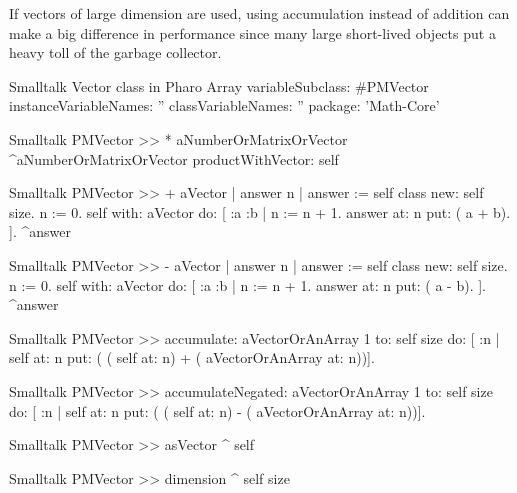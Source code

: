 If vectors of large dimension are used, using accumulation instead
of addition can make a big difference in performance since many
large short-lived objects put a heavy toll of the garbage
collector.

\begin{listing}[label=ls:vector]{Smalltalk}
{Vector class in Pharo}
Array variableSubclass: #PMVector
   instanceVariableNames: ''
   classVariableNames: ''
   package: 'Math-Core'
\end{listing}

\begin{displaycode}{Smalltalk}
PMVector >> * aNumberOrMatrixOrVector
    ^aNumberOrMatrixOrVector productWithVector: self
\end{displaycode}

\begin{displaycode}{Smalltalk}
PMVector >> + aVector
    | answer n |
    answer := self class new: self size.
    n := 0.
    self with: aVector do:
        [ :a :b | 
          n := n + 1. 
          answer at: n put: ( a + b).
        ].
    ^answer
\end{displaycode}

\begin{displaycode}{Smalltalk}
PMVector >> - aVector
    | answer n |
    answer := self class new: self size.
    n := 0.
    self with: aVector do:
        [ :a :b | 
          n := n + 1. 
          answer at: n put: ( a - b).
        ].
    ^answer
\end{displaycode}

\begin{displaycode}{Smalltalk}
PMVector >> accumulate: aVectorOrAnArray
    1 to: self size do: [ :n | self at: n put: ( ( self at: n) + ( 
                                            aVectorOrAnArray at: n))].
\end{displaycode}

\begin{displaycode}{Smalltalk}
PMVector >> accumulateNegated: aVectorOrAnArray
    1 to: self size do: [ :n | self at: n put: ( ( self at: n) - ( 
                                            aVectorOrAnArray at: n))].
\end{displaycode}

\begin{displaycode}{Smalltalk}
PMVector >> asVector
    ^ self
\end{displaycode}

\begin{displaycode}{Smalltalk}
PMVector >> dimension
    ^ self size
\end{displaycode}

